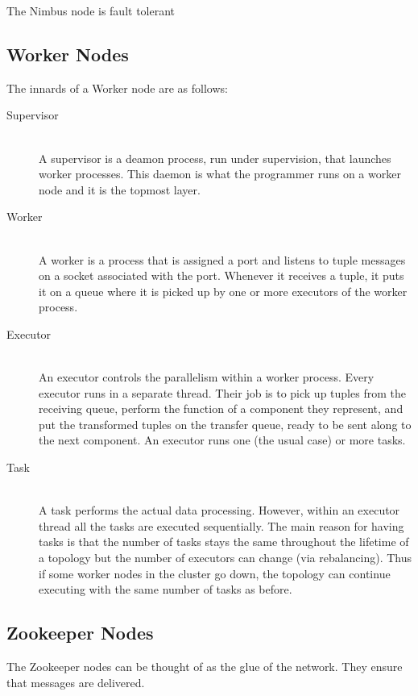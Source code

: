 \documentclass[bsc,logo,frontabs,twoside,singlespacing,normalheadings,parskip]{infthesis}     %
\begin{document}
The Nimbus node is fault tolerant

\subsection{Worker Nodes}

The innards of a Worker node are as follows:

\begin{description}
	\item[Supervisor] \hfill \\
	A supervisor is a deamon process, run under supervision, that launches worker processes. This daemon is what the programmer runs on a worker node and it is the topmost layer.
	\item[Worker] \hfill \\
	A worker is a process that is assigned a port and listens to tuple messages on a socket associated with the port. Whenever it receives a tuple, it puts it on a queue where it is picked up by one or more executors of the worker process.
	\item[Executor] \hfill \\
	An executor controls the parallelism within a worker process. Every executor runs in a separate thread. Their job is to pick up tuples from the receiving queue, perform the function of a component they represent, and put the transformed tuples on the transfer queue, ready to be sent along to the next component. An executor runs one (the usual case) or more tasks.
	\item[Task] \hfill \\
	A task performs the actual data processing. However, within an executor thread all the tasks are executed sequentially. The main reason for having tasks is that the number of tasks stays the same throughout the lifetime of a topology but the number of executors can change (via rebalancing). Thus if some worker nodes in the cluster go down, the topology can continue executing with the same number of tasks as before.
\end{description}

\subsection{Zookeeper Nodes}

The Zookeeper nodes can be thought of as the glue of the network. They ensure that messages are delivered.
\end{document}
